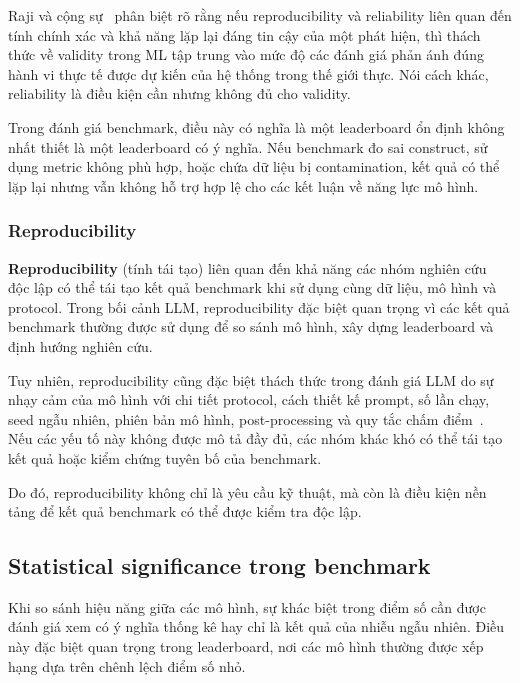 Raji và cộng sự~\cite{everything_benchmark} phân biệt rõ rằng nếu reproducibility và reliability liên quan đến tính chính xác và khả năng lặp lại đáng tin cậy của một phát hiện, thì thách thức về validity trong ML tập trung vào mức độ các đánh giá phản ánh đúng hành vi thực tế được dự kiến của hệ thống trong thế giới thực. Nói cách khác, reliability là điều kiện cần nhưng không đủ cho validity.

Trong đánh giá benchmark, điều này có nghĩa là một leaderboard ổn định không nhất thiết là một leaderboard có ý nghĩa. Nếu benchmark đo sai construct, sử dụng metric không phù hợp, hoặc chứa dữ liệu bị contamination, kết quả có thể lặp lại nhưng vẫn không hỗ trợ hợp lệ cho các kết luận về năng lực mô hình.

\subsubsection{Reproducibility}
\label{sec:reproducibility}

\textbf{Reproducibility} (tính tái tạo) liên quan đến khả năng các nhóm nghiên cứu độc lập có thể tái tạo kết quả benchmark khi sử dụng cùng dữ liệu, mô hình và protocol. Trong bối cảnh LLM, reproducibility đặc biệt quan trọng vì các kết quả benchmark thường được sử dụng để so sánh mô hình, xây dựng leaderboard và định hướng nghiên cứu.

Tuy nhiên, reproducibility cũng đặc biệt thách thức trong đánh giá LLM do sự nhạy cảm của mô hình với chi tiết protocol, cách thiết kế prompt, số lần chạy, seed ngẫu nhiên, phiên bản mô hình, post-processing và quy tắc chấm điểm~\cite{measuring_what_matters}. Nếu các yếu tố này không được mô tả đầy đủ, các nhóm khác khó có thể tái tạo kết quả hoặc kiểm chứng tuyên bố của benchmark.

Do đó, reproducibility không chỉ là yêu cầu kỹ thuật, mà còn là điều kiện nền tảng để kết quả benchmark có thể được kiểm tra độc lập.

\subsection{Statistical significance trong benchmark}
\label{sec:statistical_significance}

Khi so sánh hiệu năng giữa các mô hình, sự khác biệt trong điểm số cần được đánh giá xem có ý nghĩa thống kê hay chỉ là kết quả của nhiễu ngẫu nhiên. Điều này đặc biệt quan trọng trong leaderboard, nơi các mô hình thường được xếp hạng dựa trên chênh lệch điểm số nhỏ.

